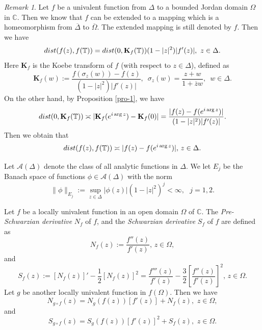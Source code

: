 \documentclass[11pt]{amsart}
\theoremstyle{remark}
\newtheorem{remark}[theorem]{Remark}
\theoremstyle{claim}
\theoremstyle{definition}
\theoremstyle{problem}
\theoremstyle{conjecture}
\theoremstyle{question}
\numberwithin{equation}{section}
\begin{document}
 \begin{remark}\label{re-2}
Let $f$ be a univalent function from $\Delta$ to a bounded Jordan domain $\Omega$ in $\mathbb{C}$. Then we know that  $f$ can be extended to a mapping which is a homeomorphism from $\overline{\Delta}$ to $\overline{\Omega}$.
The extended mapping is still denoted by $f$. Then we have
\begin{equation}
{\textup{dist}}(f(z), f(\mathbb{T}))={\textup{dist}}(0, \mathbf{K}_f(\mathbb{T}))(1-|z|^2)|f'(z)|,\,\,z\in \Delta. \nonumber
\end{equation}
Here $\mathbf{K}_f$ is the Koebe transform of $f$ (with respect to $z\in \Delta$), defined as
\begin{equation}
\mathbf{K}_f(w):=\frac{f(\sigma_{z}(w))-f(z)}{(1-|z|^2)|f'(z)|},\,\,\,\sigma_{z}(w)=\frac{z+w}{1+\overline{z}w},\,\,\, w\in \Delta.\nonumber \end{equation}
On the other hand, by Proposition \ref{pro-1}, we have
$${\textup{dist}}(0, \mathbf{K}_f(\mathbb{T}))\asymp |\mathbf{K}_f(e^{i\arg z})-\mathbf{K}_f(0)|=\frac{|f(z)-f(e^{i\arg z})|}{(1-|z|^2)|f'(z)|}.$$
Then we obtain that
\begin{equation}
{\textup{dist}}(f(z), f(\mathbb{T}))\asymp |f(z)-f(e^{i\arg z})|,\, z\in \Delta. \nonumber
\end{equation}
\end{remark}

Let $\mathcal{A}(\Delta)$ denote the class of all analytic functions in $\Delta$.    We let ${E}_j$ be  the Banach space of functions $\phi \in \mathcal{A}(\Delta)$ with the norm
  \begin{equation}
 \|\phi\|_{E_j}:= \sup_{z\in \Delta} |\phi(z)|(1-|z|^2)^{j}<\infty, \,\,\,\, j=1,2. \nonumber
 \end{equation}

Let $f$ be a locally univalent function in an open domain $\Omega$ of $\mathbb{C}$. The {\em Pre-Schwarzian derivative} $N_f$ of $f$, and the {\em Schwarzian derivative} $S_f$ of $f$ are defined as
 $$N_f(z):=\frac{f''(z)}{{f'(z)}}, \, z\in \Omega,$$ and 
 $$S_f(z):=[N_f(z)]'-\frac{1}{2}[N_f(z)]^2=\frac{f'''(z)}{f'(z)}-\frac{3}{2}\left[\frac{f''(z)}{f'(z)}\right]^2, \,z\in \Omega.$$
Let $g$ be another locally univalent function in $f(\Omega)$. Then we have
\begin{equation}\label{chain}N_{g \circ f}(z)=N_{g}(f(z))[f'(z)]+N_f(z),\,\, z\in \Omega,  \end{equation}
and \begin{equation}\label{chain-1}S_{g \circ f}(z)=S_{g}(f(z))[f'(z)]^2+S_f(z),\,\, z\in \Omega. \end{equation}
\end{document}
